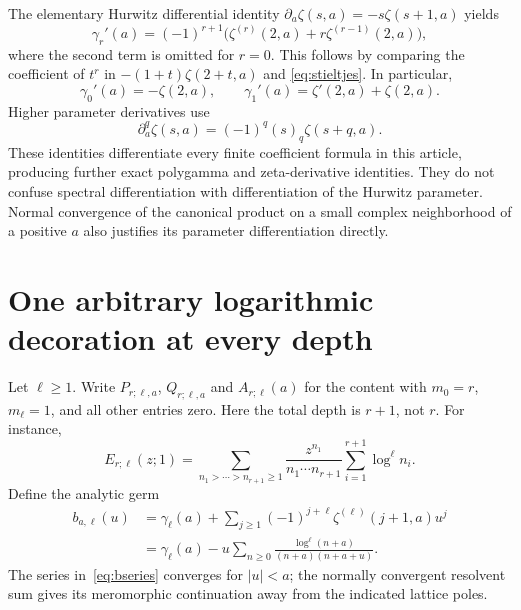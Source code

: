 \documentclass[11pt,oneside]{article}
\numberwithin{equation}{section}
\theoremstyle{definition}
\theoremstyle{remark}
\begin{document}
The elementary Hurwitz differential identity
$\partial_a\zeta(s,a)=-s\zeta(s+1,a)$ yields
\begin{equation}\label{eq:gamma-derivative}
\boxed{\displaystyle
\gamma_r'(a)=(-1)^{r+1}
 \bigl(\zeta^{(r)}(2,a)+r\zeta^{(r-1)}(2,a)\bigr),}
\end{equation}
where the second term is omitted for $r=0$. This follows by comparing the
coefficient of $t^r$ in $-(1+t)\zeta(2+t,a)$ and
\eqref{eq:stieltjes}. In particular,
\[
\gamma_0'(a)=-\zeta(2,a),\qquad
\gamma_1'(a)=\zeta'(2,a)+\zeta(2,a).
\]
Higher parameter derivatives use
\begin{equation}\label{eq:hurwitz-derivative}
\partial_a^q\zeta(s,a)=(-1)^q(s)_q\zeta(s+q,a).
\end{equation}
These identities differentiate every finite coefficient formula in this
article, producing further exact polygamma and zeta-derivative identities.
They do not confuse spectral differentiation with differentiation of the
Hurwitz parameter. Normal convergence of the canonical product on a small
complex neighborhood of a positive $a$ also justifies its parameter
 differentiation directly.

\section{One arbitrary logarithmic decoration at every depth}
\label{sec:one-decoration}

Let $\ell\ge1$. Write $P_{r;\ell,a}$, $Q_{r;\ell,a}$ and $A_{r;\ell}(a)$
for the content with $m_0=r$, $m_\ell=1$, and all other entries zero.
Here the total depth is $r+1$, not $r$. For instance,
\[
E_{r;\ell}(z;1)=\sum_{n_1>\cdots>n_{r+1}\ge1}
 \frac{z^{n_1}}{n_1\cdots n_{r+1}}
 \sum_{i=1}^{r+1}\log^\ell n_i.
\]
Define the analytic germ
\begin{align}
b_{a,\ell}(u)
&=\gamma_\ell(a)+\sum_{j\ge1}(-1)^{j+\ell}
                        \zeta^{(\ell)}(j+1,a)u^j\label{eq:bseries}\\
&=\gamma_\ell(a)-u\sum_{n\ge0}
 \frac{\log^\ell(n+a)}{(n+a)(n+a+u)}.
\label{eq:bresolvent}
\end{align}
The series in~\eqref{eq:bseries} converges for $|u|<a$; the normally
convergent resolvent sum gives its meromorphic continuation away from the
indicated lattice poles.
\end{document}
